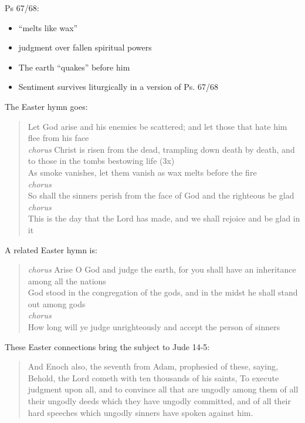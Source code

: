 \documentclass{beamer}
\begin{document}
\begin{frame}
  Ps 67/68:\pause
  \begin{itemize}
	\item ``melts like wax''\pause
	\item judgment over fallen spiritual powers\pause
	\item The earth ``quakes'' before him\pause
	\item Sentiment survives liturgically in a version of Ps. 67/68
  \end{itemize}
\end{frame}

\begin{frame}
  The Easter hymn goes:
  \begin{quote}
	Let God arise and his enemies be scattered; and let those that hate him flee from his face\\
	\emph{chorus} Christ is risen from the dead, trampling down death by death, and to those in the tombs bestowing life (3x)\\
	As smoke vanishes, let them vanish as wax melts before the fire\\
	\emph{chorus}\\
	So shall the sinners perish from the face of God and the righteous be glad\\
	\emph{chorus}\\
	This is the day that the Lord has made, and we shall rejoice and be glad in it
  \end{quote}
\end{frame}

\begin{frame}
  A related Easter hymn is:
  \begin{quote}
	\emph{chorus} Arise O God and judge the earth, for you shall have an inheritance among all the nations\\
	God stood in the congregation of the gods, and in the midst he shall stand out among gods\\
	\emph{chorus}\\
	How long will ye judge unrighteously and accept the person of sinners\\
  \end{quote}
\end{frame}

\begin{frame}
  These Easter connections bring the subject to Jude 14-5:
  \begin{quote}
	    And Enoch also, the seventh from Adam, prophesied of these, saying,
        Behold, the Lord cometh with ten thousands of his saints,
		To execute judgment upon all, and to convince all that are ungodly among
        them of all their ungodly deeds which they have ungodly committed, and
        of all their hard speeches which ungodly sinners have spoken against
        him.
  \end{quote}
\end{frame}
\end{document}
